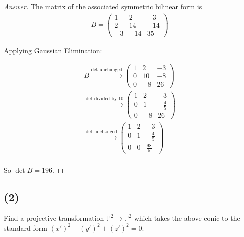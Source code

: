 \documentclass{article}
\theoremstyle{definition}
\theoremstyle{definition}
\theoremstyle{remark}
\begin{document}
\begin{proof}[Answer]
	The matrix of the associated symmetric bilinear form is 
	\begin{align*}
		B = 
		\begin{pmatrix}
			1 & 2 & -3\\
			2 & 14 & -14\\
			-3 & -14 & 35
		\end{pmatrix}
	\end{align*}

	Applying Gaussian Elimination:

	\begin{align*}
		B \xrightarrow{\text{det unchanged}}
		\begin{pmatrix}
			1 & 2 & -3\\
			0 & 10 & -8\\
			0 & -8 & 26
		\end{pmatrix} \\
		\xrightarrow{\text{det divided by 10}}
		\begin{pmatrix}
			1 & 2 & -3\\
			0 & 1 & -\frac{4}{5}\\
			0 & -8 & 26
		\end{pmatrix} \\
		\xrightarrow{\text{det unchanged}}
		\begin{pmatrix} 
			1 & 2 & -3\\
			0 & 1 & -\frac{4}{5}\\
			0 &  0& \frac{98}{5}
		\end{pmatrix} \\
	\end{align*}

	So $\det B = 196$.

\end{proof}
    
\subsection*{(2)}
Find a projective transformation \(\mathbb{P}^2 \rightarrow \mathbb{P}^2\) which takes the above conic to the standard form \((x')^2 + (y')^2 + (z')^2 = 0\).
\end{document}
